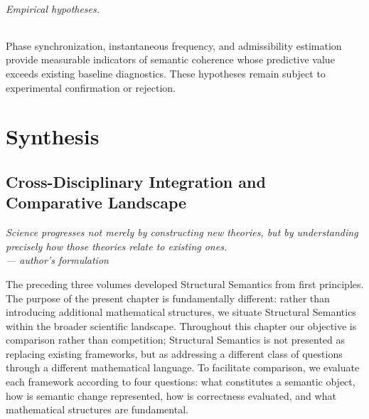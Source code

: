 \documentclass[11pt,twoside,openright]{book}
\numberwithin{equation}{chapter}
\theoremstyle{definition}
\theoremstyle{plain}
\theoremstyle{remark}
\theoremstyle{definition}
\begin{document}
\paragraph{Empirical hypotheses.} Phase synchronization, instantaneous
frequency, and admissibility estimation provide measurable indicators of
semantic coherence whose predictive value exceeds existing baseline
diagnostics. These hypotheses remain subject to experimental confirmation
or rejection.

\part{Synthesis}

\chapter{Cross-Disciplinary Integration and Comparative Landscape}
\label{ch:comparative-landscape}

\vspace{1em}
\begin{flushright}\itshape
Science progresses not merely by constructing new theories, but by
understanding precisely how those theories relate to existing ones.\\
\upshape --- author's formulation
\end{flushright}
\vspace{1em}

The preceding three volumes developed Structural Semantics from first
principles. The purpose of the present chapter is fundamentally
different: rather than introducing additional mathematical structures, we
situate Structural Semantics within the broader scientific landscape.
Throughout this chapter our objective is comparison rather than
competition; Structural Semantics is not presented as replacing existing
frameworks, but as addressing a different class of questions through a
different mathematical language. To facilitate comparison, we evaluate
each framework according to four questions: what constitutes a semantic
object, how is semantic change represented, how is correctness evaluated,
and what mathematical structures are fundamental.
\end{document}
